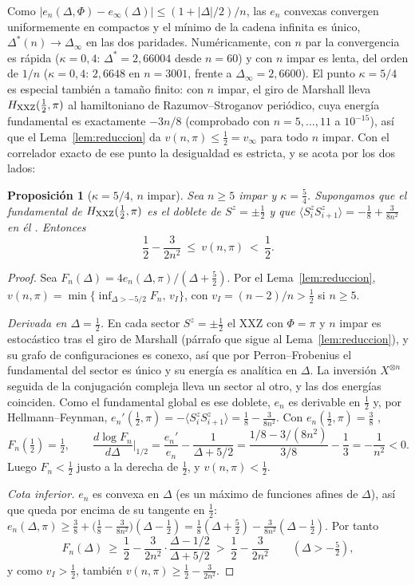 \documentclass[11pt,a4paper]{article}
\newtheorem{proposicion}[teorema]{Proposición}
\theoremstyle{remark}
\newcommand{\ev}[1]{\langle #1\rangle}
\begin{document}
Como $|e_n(\Delta,\Phi)-e_\infty(\Delta)|\le(1+|\Delta|/2)/n$, las $e_n$ convexas convergen
uniformemente en compactos y el mínimo de la cadena infinita es único, $\Delta^\ast(n)\to\Delta_\infty$
en las dos paridades. Numéricamente, con $n$
par la convergencia es rápida ($\kappa=0{,}4$: $\Delta^\ast=2{,}66004$ desde $n=60$) y con $n$
impar es lenta, del orden de $1/n$ ($\kappa=0{,}4$: $2{,}6648$ en $n=3001$, frente a
$\Delta_\infty=2{,}6600$). El punto $\kappa=5/4$ es especial también a tamaño finito: con $n$ impar,
el giro de Marshall lleva $H_{\rm XXZ}(\tfrac12,\pi)$ al hamiltoniano de Razumov--Stroganov
periódico, cuya energía fundamental es exactamente $-3n/8$ \cite{fsz} (comprobado con $n=5,\dots,11$ a
$10^{-15}$), así que el Lema~\ref{lem:reduccion} da $v(n,\pi)\le\tfrac12=v_\infty$ para todo $n$
impar. Con el correlador exacto de ese punto la desigualdad es estricta, y se acota por los dos
lados:

\begin{proposicion}[$\kappa=5/4$, $n$ impar]\label{prop:rs}
Sea $n\ge5$ impar y $\kappa=\tfrac54$. Supongamos que el fundamental de $H_{\rm XXZ}(\tfrac12,\pi)$
es el doblete de $S^z=\pm\tfrac12$ y que $\ev{S^z_iS^z_{i+1}}=-\tfrac18+\tfrac3{8n^2}$ en él
\cite{stroganov}. Entonces
\[
  \frac12-\frac3{2n^2}\ \le\ v(n,\pi)\ <\ \frac12 .
\]
\end{proposicion}

\begin{proof}
Sea $F_n(\Delta)=4e_n(\Delta,\pi)/(\Delta+\tfrac52)$. Por el Lema~\ref{lem:reduccion},
$v(n,\pi)=\min\{\inf_{\Delta>-5/2}F_n,\,v_I\}$, con $v_I=(n-2)/n>\tfrac12$ si $n\ge5$.

\emph{Derivada en $\Delta=\tfrac12$.} En cada sector $S^z=\pm\tfrac12$ el XXZ con $\Phi=\pi$ y $n$
impar es estocástico tras el giro de Marshall (párrafo que sigue al Lema~\ref{lem:reduccion}), y su grafo de
configuraciones es conexo, así que por Perron--Frobenius el fundamental del sector es único y su
energía es analítica en $\Delta$. La inversión $X^{\otimes n}$ seguida de la conjugación compleja
lleva un sector al otro, y las dos energías coinciden. Como el fundamental global es ese doblete,
$e_n$ es derivable en $\tfrac12$ y, por Hellmann--Feynman,
$e_n'(\tfrac12,\pi)=-\ev{S^z_iS^z_{i+1}}=\tfrac18-\tfrac3{8n^2}$. Con $e_n(\tfrac12,\pi)=\tfrac38$
\cite{fsz},
\[
  F_n(\tfrac12)=\tfrac12,\qquad
  \frac{d\log F_n}{d\Delta}\Big|_{1/2}=\frac{e_n'}{e_n}-\frac1{\Delta+5/2}
  =\frac{1/8-3/(8n^2)}{3/8}-\frac13=-\frac1{n^2}<0 .
\]
Luego $F_n<\tfrac12$ justo a la derecha de $\tfrac12$, y $v(n,\pi)<\tfrac12$.

\emph{Cota inferior.} $e_n$ es convexa en $\Delta$ (es un máximo de funciones afines de $\Delta$), así que queda por
encima de su tangente en $\tfrac12$:
$e_n(\Delta,\pi)\ge\tfrac38+\big(\tfrac18-\tfrac3{8n^2}\big)(\Delta-\tfrac12)
=\tfrac18(\Delta+\tfrac52)-\tfrac3{8n^2}(\Delta-\tfrac12)$. Por tanto
\[
  F_n(\Delta)\ \ge\ \frac12-\frac3{2n^2}\cdot\frac{\Delta-1/2}{\Delta+5/2}\ >\ \frac12-\frac3{2n^2}
  \qquad(\Delta>-\tfrac52),
\]
y como $v_I>\tfrac12$, también $v(n,\pi)\ge\tfrac12-\tfrac3{2n^2}$.
\end{proof}
\end{document}
